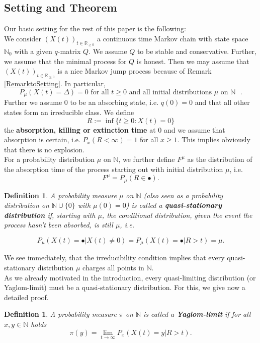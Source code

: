\documentclass[12pt,a4paper]{scrartcl}
\newtheorem{definition}[theorem]{Definition}
\numberwithin{equation}{section}
\newcommand{\R}{\mathbb{R}} %
\newcommand{\N}{\mathbb{N}} %
\begin{document}
\subsection{Setting and Theorem}
Our basic setting for the rest of this paper is the following:\\
We consider $\left(X\left(t\right)\right)_{t \in \R_{\geq 0}}$ a continuous time Markov chain with state space $\N_0$ with a given $q$-matrix $Q$. We assume $Q$ to be stable and conservative. Further, we assume that the minimal process for $Q$ is honest. Then we may assume that $\left(X\left(t\right)\right)_{t \in \R_{\geq 0}} $ is a nice Markov jump process because of Remark \ref{RemarktoSetting}.
In particular,
$$ P_{\mu}\left(X\left(t\right) = \Delta \right) = 0 \text{ for all $t \geq 0$ and all initial distributions $\mu$ on $\N$ }. $$
Further we assume $0$ to be an absorbing state, i.e. $q\left(0\right) = 0$ and that all other states form an irreducible class.
We define
$$ R := \inf \lbrace t\geq 0 : X\left(t\right) = 0\rbrace  $$
the \textbf{absorption, killing or extinction time} at $0$ and we assume that absorption is certain, i.e. $ P_x \left(R < \infty\right) = 1 $ for all $x \geq 1 $. This implies obviously that there is no explosion.\\
For a probability distribution $\mu$ on $\N$, we further define $F^{\mu}$ as the distribution of the absorption time of the process starting out with initial distribution $\mu$, i.e.
\begin{equation}
F^{\mu} = P_{\mu}\left(R \in \bullet\right).
\end{equation} 

\begin{definition}
A probability measure $\mu$ on $\N$ (also seen as a probability distribution on $\N \cup \lbrace  0\rbrace $ with $\mu\left(0\right) = 0$) is called a \textbf{quasi-stationary distribution} if, starting with $\mu$, the conditional distribution, given the event the process hasn't been absorbed, is still $\mu$, i.e.

$$ P_{\mu}\left(X\left(t\right) = \bullet | X\left(t\right) \neq 0\right) = P_{\mu}\left(X\left(t\right) = \bullet | R > t\right) = \mu.$$

\end{definition}
We see immediately, that the irreducibility condition implies that every quasi-stationary distribution $\mu$ charges all points in $\N.$ \\

As we already motivated in the introduction, every quasi-limiting distribution (or Yaglom-limit) must be a quasi-stationary distribution. For this, we give now a detailed proof.
\begin{definition}
A probability measure $\pi$ on $\N$ is called a \textbf{Yaglom-limit} if for all $x,y \in \N$ holds
$$ \pi\left(y\right) = \lim_{t \to \infty} P_x\left(X\left(t\right) = y | R > t \right). $$
\end{definition}
\end{document}
